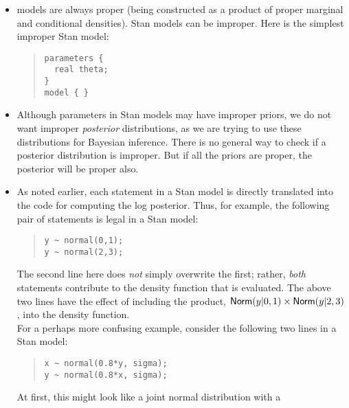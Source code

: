 \begin{itemize}
\item \BUGS models are always proper (being constructed as a product
  of proper marginal and conditional densities).  Stan models can be
  improper.  Here is the simplest improper Stan model: 
\begin{quote}
\begin{Verbatim}[fontsize=\small]
parameters {
  real theta;
} 
model { }
\end{Verbatim}
\end{quote}
\item Although parameters in Stan models may have improper priors, we
  do not want improper \emph{posterior} distributions, as we are trying to
  use these distributions for Bayesian inference.  There is no general
  way to check if a posterior distribution is improper.  But if all
  the priors are proper, the posterior will be proper also.
\item
  As noted earlier, each statement in a Stan model is directly translated into the \Cpp code for computing the log posterior.  Thus, for example, the following pair of statements is legal in a Stan model:
\begin{quote}
\begin{Verbatim}[fontsize=\small]
y ~ normal(0,1);
y ~ normal(2,3);
\end{Verbatim}
\end{quote}
%
The second line here does \emph{not} simply overwrite the first;
rather, \emph{both} statements contribute to the density function that
is evaluated.  The above two lines have the effect of including the
product, $\distro{Norm}(y|0,1) \times \distro{Norm}(y|2,3)$, into the
density function.
\\[6pt] 
For a perhaps more confusing example, consider the following two lines in a Stan model:
\begin{quote}
\begin{Verbatim}[fontsize=\small]
x ~ normal(0.8*y, sigma);
y ~ normal(0.8*x, sigma);
\end{Verbatim}
\end{quote}
%
At first, this might look like a joint normal distribution with a

\end{itemize}
